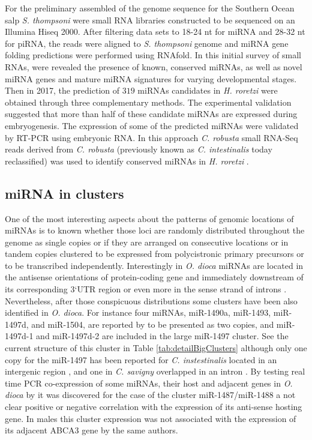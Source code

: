 \documentclass[graybox]{svmult}
\begin{document}
For the preliminary assembled of the genome sequence for the 
Southern Ocean salp \textit{S. thompsoni} \cite{Jue2016} were small RNA 
libraries constructed to be sequenced on an Illumina Hiseq 2000. After filtering 
data sets to 18-24 nt for miRNA and 28-32 nt for piRNA, the reads were aligned 
to \textit{S. thompsoni} genome and miRNA gene folding predictions were 
performed using RNAfold. In this initial survey of small RNAs, were revealed the 
presence of known, conserved miRNAs, as well as novel miRNA genes and mature 
miRNA signatures for varying developmental stages. Then in 2017, the prediction 
of $319$ miRNAs candidates in \textit{H. roretzi} were obtained through three 
complementary methods. The experimental validation suggested that more than half 
of these candidate miRNAs are expressed during embryogenesis. The expression of 
some of the predicted miRNAs were validated by RT-PCR using embryonic RNA. In 
this approach \textit{C. robusta} small RNA-Seq reads derived from \textit{C. 
robusta} \cite{Shi2009} (previously known as  \textit{C. intestinalis} today 
reclassified) was used to identify conserved miRNAs in \textit{H. roretzi} 
\cite{Wang2017}.


\subsection{miRNA in clusters}

One of the most interesting aspects about the patterns of genomic locations of 
miRNAs is to known whether those loci are randomly distributed throughout the 
genome as single copies or if they are arranged on consecutive locations or in 
tandem copies clustered to be expressed from polycistronic primary precursors or 
to be transcribed independently. Interestingly in \textit{O. dioca} miRNAs are 
located in the antisense orientations of protein-coding gene and immediately 
downstream of its corresponding 3`UTR region or even more in the sense strand of 
introns \cite{Fu2008}. Nevertheless, after those conspicuous distributions some 
clusters have been also identified in \textit{O. dioca}. For instance four 
miRNAs, miR-1490a, miR-1493, miR-1497d, and miR-1504, are reported by 
\cite{Fu2008} to be presented as two copies, and miR-1497d-1 and miR-1497d-2 are 
included in the large miR-1497 cluster. See the current structure of this 
cluster in Table \ref{tab:detailBigClusters} although only one copy for the  
miR-1497 has been reported for \textit{C. instestinalis} located in an 
intergenic region \cite{Fu2008}, \cite{Hendrix2010} and one in \textit{C. 
savigny} overlapped in an intron \cite{Fu2008}. By testing real time PCR 
co-expression of some miRNAs, their host and adjacent genes in \textit{O. dioca} 
by \cite{Fu2008} it was discovered for the case of the cluster  
miR-1487/miR-1488 a not clear positive or negative correlation with the 
expression of its anti-sense hosting gene. In males this cluster expression was 
not associated with the expression of its adjacent ABCA3 gene by the same 
authors.  
\end{document}
